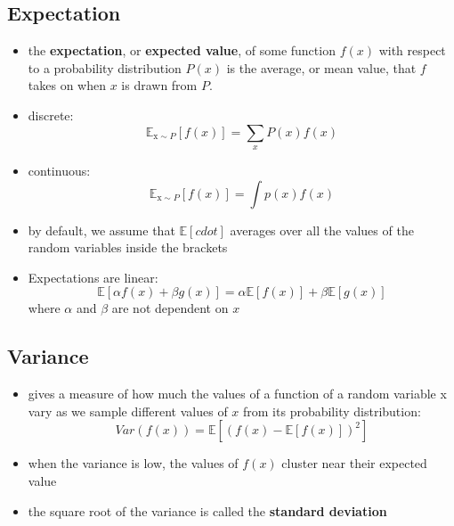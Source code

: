 \documentclass[11pt, twocolumn]{report}
\def\expectation{\mathbb{E}}
\begin{document}
\subsection{Expectation}
\begin{itemize}
  \item the \textbf{expectation}, or \textbf{expected value}, of some function
    $f(x)$ with respect to a probability distribution $P(x)$ is the average, or
    mean value, that $f$ takes on when $x$ is drawn from $P$.
  \item discrete:
    \begin{equation}
      \expectation_{\text{x} \sim P}[f(x)] = \sum_x P(x)f(x)
    \end{equation}
  \item continuous:
    \begin{equation}
      \expectation_{\text{x} \sim P}[f(x)] = \int p(x)f(x)
    \end{equation}
  \item by default, we assume that $\expectation{[cdot]}$ averages over all the
    values of the random variables inside the brackets
  \item Expectations are linear:
    \begin{equation}
      \expectation{[\alpha f(x) + \beta g(x)]} = \alpha \expectation
      {[f(x)]} + \beta \expectation{[g(x)]}
    \end{equation}
    where $\alpha$ and $\beta$ are not dependent on $x$
\end{itemize}

\subsection{Variance}
\begin{itemize}
  \item gives a measure of how much the values of a function of a random
    variable x vary as we sample different values of $x$ from its probability
    distribution:
    \begin{equation}
      Var(f(x)) = \expectation{[(f(x)- \expectation{[f(x)]})^{2}]}
    \end{equation}
  \item when the variance is low, the values of $f(x)$ cluster near their
    expected value
  \item the square root of the variance is called the \textbf{standard
      deviation}
\end{itemize}
\end{document}

